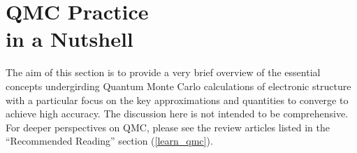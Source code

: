 \documentclass[oneside,11pt]{memoir}
\numberwithin{equation}{section}
\newcommand{\bu}[1]{\textbf{\underline{#1}}}
\begin{document}
%
%



\pagebreak
\chapter{QMC Practice \\in a Nutshell}\label{theory}
The aim of this section is to provide a very brief overview of the 
essential concepts undergirding Quantum Monte Carlo calculations 
of electronic structure with a particular focus on the key 
approximations and quantities to converge to achieve high
accuracy.  The discussion here is not intended to be comprehensive. 
For deeper perspectives on QMC, please see the review articles 
listed in the ``Recommended Reading'' section (\ref{learn_qmc}).
\end{document}
